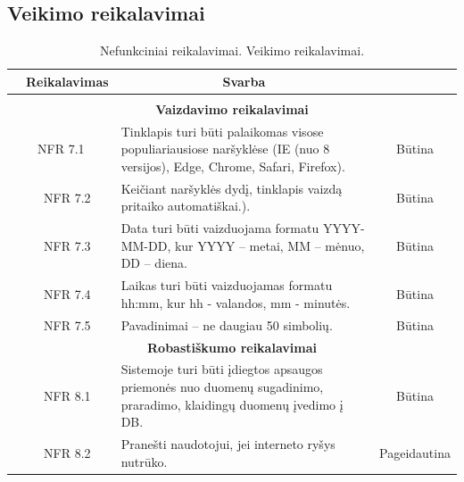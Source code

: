 \documentclass{VUMIFPSkursinis}
\begin{document}
\subsection{Veikimo reikalavimai}
\begin{table}[H]
	\caption{Nefunkciniai reikalavimai. Veikimo reikalavimai.}
	\begin{tabular}{|p{1cm}|p{1cm}|p{}|p{}|}
	\hline 
\rowcolor{gray!50}
		\multicolumn{2}{|c|}{{\bfseries Kodas}}&
		\multicolumn{1}{c|}{{\bfseries Reikalavimas}}&
		\multicolumn{1}{c|}{{\bfseries Svarba}}\\
\hline
\rowcolor{lightgray}
\multicolumn{4}{|c|}{Veikimo reikalavimai}\\		

\hline
\multicolumn{4}{|c|}{\bfseries Vaizdavimo reikalavimai}\\	

\hline
	\multicolumn{2}{|c|}{NFR 7.1}&
	{Tinklapis turi būti palaikomas visose populiariausiose naršyklėse (IE (nuo 8 versijos), Edge, Chrome, Safari, Firefox).
}&		
	\multicolumn{1}{c|}{Būtina}\\
\hline
	\multicolumn{1}{|c}{}&
	\multicolumn{1}{c|}{NFR 7.2}&
	{Keičiant naršyklės dydį, tinklapis vaizdą pritaiko automatiškai.).
}&		
	\multicolumn{1}{c|}{Būtina}\\

\hline
	\multicolumn{1}{|c}{}&
	\multicolumn{1}{c|}{NFR 7.3}&
	{Data turi būti vaizduojama formatu YYYY-MM-DD, kur
YYYY – metai, MM – mėnuo, DD – diena.
}&		
	\multicolumn{1}{c|}{Būtina}\\
	
	\hline
	\multicolumn{1}{|c}{}&
	\multicolumn{1}{c|}{NFR 7.4}&
	{Laikas turi būti vaizduojamas formatu hh:mm, kur hh - valandos, mm - minutės.
}&		
	\multicolumn{1}{c|}{Būtina}\\
	
		\hline
	\multicolumn{1}{|c}{}&
	\multicolumn{1}{c|}{NFR 7.5}&
	{Pavadinimai – ne daugiau 50 simbolių.
}&		
	\multicolumn{1}{c|}{Būtina}\\

	\hline
\multicolumn{4}{|c|}{\bfseries Robastiškumo reikalavimai}\\		
				
	\hline
		\multicolumn{1}{|c}{}&
		\multicolumn{1}{c|}{NFR 8.1}&
		{Sistemoje turi būti įdiegtos apsaugos priemonės nuo duomenų sugadinimo, praradimo, klaidingų duomenų įvedimo į DB.
		}&
		\multicolumn{1}{c|}{Būtina}\\	
\hline		
		\multicolumn{1}{|c}{}&
		\multicolumn{1}{c|}{NFR 8.2}&
		{Pranešti naudotojui, jei interneto ryšys nutrūko.
		}&
		\multicolumn{1}{c|}{Pageidautina}\\		
				

\end{tabular}
\end{table}
\end{document}
